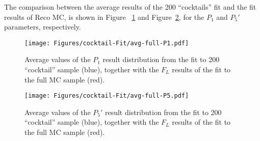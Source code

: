The comparison between the average results of the 200 ``cocktails'' fit and the fit results of Reco MC, is shown in Figure ~\ref{fig:closure-full-cocktail-p1} and Figure~\ref{fig:closure-full-cocktail-P5'}, for the $P_1$ and $P_5'$  parameters, respectively.


\begin{figure}[!hbt]
  \centering
  \texttt{[image: Figures/cocktail-Fit/avg-full-P1.pdf]}
  \caption{Average values of the $P_1$ result distribution from the fit to 200 ``cocktail'' sample (blue), together with the $F_L$ results of the fit to the full MC sample (red).}
  \label{fig:closure-full-cocktail-p1}
\end{figure}

\begin{figure}[!hbt]
  \centering
  \texttt{[image: Figures/cocktail-Fit/avg-full-P5.pdf]}
  \caption{Average values of the $P_5'$ result distribution from the fit to 200 ``cocktail'' sample (blue), together with the $F_L$ results of the fit to the full MC sample (red).}
  \label{fig:closure-full-cocktail-P5'}
\end{figure}

\clearpage





